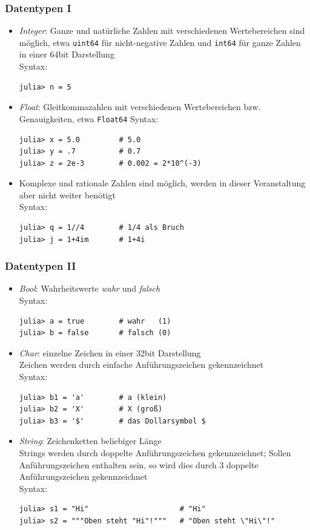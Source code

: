 \begin{frame}[fragile]
\frametitle{Datentypen I}
\begin{itemize}[<+->] 
\item \textit{Integer}: Ganze und natürliche Zahlen mit verschiedenen Wertebereichen sind möglich, etwa \verb+uint64+ für nicht-negative Zahlen und \verb+int64+ für ganze Zahlen in einer 64bit Darstellung\\
Syntax: \begin{verbatim}julia> n = 5\end{verbatim}
\item \textit{Float}: Gleitkommazahlen mit verschiedenen Wertebereichen bzw. Genauigkeiten, etwa \verb+Float64+
Syntax: \begin{verbatim}
julia> x = 5.0         # 5.0
julia> y = .7          # 0.7
julia> z = 2e-3        # 0.002 = 2*10^(-3)
\end{verbatim}
\item Komplexe und rationale Zahlen sind möglich, werden in dieser Veranstaltung aber nicht weiter benötigt\\ Syntax:
\begin{verbatim}
julia> q = 1//4        # 1/4 als Bruch
julia> j = 1+4im       # 1+4i
\end{verbatim}
\end{itemize}
\end{frame}
\begin{frame}[fragile]
\frametitle{Datentypen II}
\begin{itemize}[<+->] 
\item \textit{Bool}: Wahrheitswerte \textit{wahr} und \textit{falsch}\\Syntax:
\begin{verbatim}
julia> a = true        # wahr   (1)
julia> b = false       # falsch (0)
\end{verbatim}
\item \textit{Char}: einzelne Zeichen in einer 32bit Darstellung\\ Zeichen werden durch einfache Anführungszeichen gekennzeichnet \\ Syntax:
\begin{verbatim}
julia> b1 = 'a'        # a (klein)
julia> b2 = 'X'        # X (groß)
julia> b3 = '$'        # das Dollarsymbol $
\end{verbatim}
\item \textit{String}: Zeichenketten beliebiger Länge\\
Strings werden durch doppelte Anführungszeichen gekennzeichnet; Sollen Anführungszeichen enthalten sein, so wird dies durch 3 doppelte Anführungszeichen gekennzeichnet\\Syntax:
\begin{verbatim}
julia> s1 = "Hi"                     # "Hi"
julia> s2 = """Oben steht "Hi"!"""   # "Oben steht \"Hi\"!"
\end{verbatim}
\end{itemize}
\end{frame}
